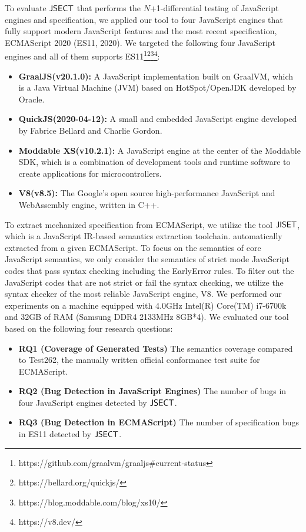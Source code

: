 To evaluate $\text{\sf JSECT}$ that performs the $N$+1-differential testing of JavaScript
engines and specification, we applied our tool to four JavaScript engines that
fully support modern JavaScript features and the most recent specification,
ECMAScript 2020 (ES11, 2020).  We targeted the following four JavaScript
engines and all of them supports
ES11\footnote{https://github.com/graalvm/graaljs\#current-status}\footnote{https://bellard.org/quickjs/}\footnote{https://blog.moddable.com/blog/xs10/}\footnote{https://v8.dev/}:
\begin{itemize}
  \item \textbf{GraalJS(v20.1.0):} A JavaScript implementation built on
    GraalVM\cite{graaljs}, which is a Java Virtual Machine (JVM) based on
    HotSpot/OpenJDK developed by Oracle.
  \item \textbf{QuickJS(2020-04-12):} A small and embedded JavaScript engine developed by
    Fabrice Bellard and Charlie Gordon\cite{qjs}.
  \item \textbf{Moddable XS(v10.2.1):} A JavaScript engine at the center of the Moddable
    SDK\cite{xs}, which is a combination of development tools and runtime
    software to create applications for microcontrollers.
  \item \textbf{V8(v8.5):} The Google's open source high-performance JavaScript and
    WebAssembly engine\cite{v8}, written in C++.
\end{itemize}
To extract mechanized specification from ECMAScript, we utilize the tool
$\text{\sf JISET}$, which is a JavaScript IR-based semantics extraction toolchain.
automatically extracted from a given ECMAScript.  To focus on the semantics of
core JavaScript semantics, we only consider the semantics of strict mode
JavaScript codes that pass syntax checking including the EarlyError rules.  To
filter out the JavaScript codes that are not strict or fail the syntax checking,
we utilize the syntax checker of the most reliable JavaScript engine, V8.
We performed our experiments on a machine equipped with 4.0GHz Intel(R) Core(TM)
i7-6700k and 32GB of RAM (Samsung DDR4 2133MHz 8GB*4).  We evaluated our tool
based on the following four research questions:
\begin{itemize}
  \item {\bf RQ1 (Coverage of Generated Tests)} The semantics coverage compared
    to Test262, the manually written official conformance test suite for
    ECMAScript.
  \item {\bf RQ2 (Bug Detection in JavaScript Engines)} The number of bugs in
    four JavaScript engines detected by $\text{\sf JSECT}$.
  \item {\bf RQ3 (Bug Detection in ECMAScript)} The number of specification bugs
    in ES11 detected by $\text{\sf JSECT}$.
\end{itemize}


